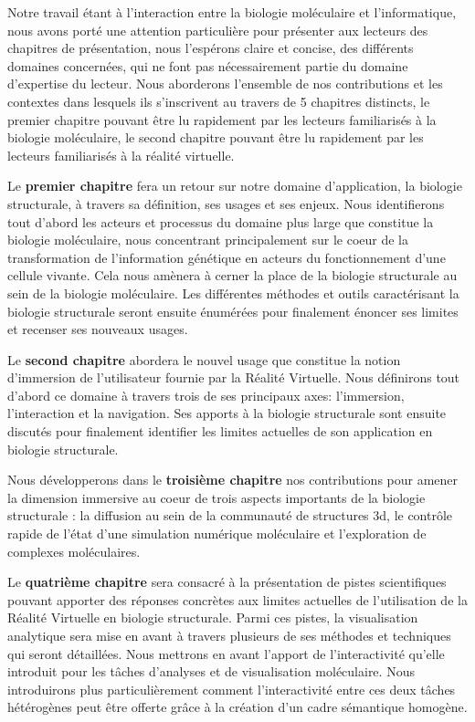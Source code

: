 Notre travail étant à l'interaction entre la biologie moléculaire et l'informatique, nous avons porté une attention particulière pour présenter aux lecteurs des chapitres de présentation, nous l'espérons claire et concise, des différents domaines concernées, qui ne font pas nécessairement partie du domaine d'expertise du lecteur. Nous aborderons l'ensemble de nos contributions et les contextes dans lesquels ils s'inscrivent au travers de 5 chapitres distincts, le premier chapitre pouvant être lu rapidement par les lecteurs familiarisés à la biologie moléculaire, le second chapitre pouvant être lu rapidement par les lecteurs familiarisés à la réalité virtuelle.

Le \textbf{premier chapitre} fera un retour sur notre domaine d'application, la biologie structurale, à travers sa définition, ses usages et ses enjeux. Nous identifierons tout d'abord les acteurs et processus du domaine plus large que constitue la biologie moléculaire, nous concentrant principalement sur le coeur de la transformation de l'information génétique en acteurs du fonctionnement d'une cellule vivante. Cela nous amènera à cerner la place de la biologie structurale au sein de la biologie moléculaire. Les différentes méthodes et outils caractérisant la biologie structurale seront ensuite énumérées pour finalement énoncer ses limites et recenser ses nouveaux usages. 

Le \textbf{second chapitre} abordera le nouvel usage que constitue la notion d'immersion de l'utilisateur fournie par la Réalité Virtuelle. Nous définirons tout d'abord ce domaine à travers trois de ses principaux axes: l'immersion, l'interaction et la navigation. Ses apports à la biologie structurale sont ensuite discutés pour finalement identifier les limites actuelles de son application en biologie structurale.

Nous développerons dans le \textbf{troisième chapitre} nos contributions pour amener la dimension immersive au coeur de trois aspects importants de la biologie structurale : la diffusion au sein de la communauté de structures 3d, le contrôle rapide de l'état d'une simulation numérique moléculaire et l'exploration de complexes moléculaires.

Le \textbf{quatrième chapitre} sera consacré à la présentation de pistes scientifiques pouvant apporter des réponses concrètes aux limites actuelles de l'utilisation de la Réalité Virtuelle en biologie structurale. Parmi ces pistes, la visualisation analytique sera mise en avant à travers plusieurs de ses méthodes et techniques qui seront détaillées. Nous mettrons en avant l'apport de l'interactivité qu'elle introduit pour les tâches d'analyses et de visualisation moléculaire. Nous introduirons plus particulièrement comment l'interactivité entre ces deux tâches hétérogènes peut être offerte grâce à la création d'un cadre sémantique homogène. 

